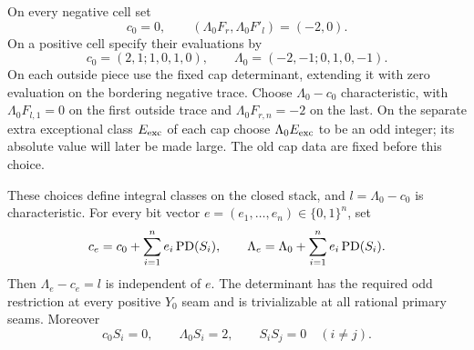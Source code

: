 On every negative cell set
\[
 c_0=0,\qquad (\Lambda_0F_r,\Lambda_0F'_l)=(-2,0).
\]
On a positive cell specify their evaluations by
\begin{equation}
 c_0=(2,1;1,0,1,0),\qquad
 \Lambda_0=(-2,-1;0,1,0,-1).
\label{eq:stack:base-lifts}
\end{equation}
On each outside piece use the fixed cap determinant, extending it with
zero evaluation on the bordering negative trace.  Choose
\(\Lambda_0-c_0\) characteristic, with
\(\Lambda_0F_{l,1}=0\) on the first outside trace and
\(\Lambda_0F_{r,n}=-2\) on the last.  On the separate extra exceptional
class \(E_{\rm exc}\) of each cap choose
\(\Lambda_0E_{\rm exc}\) to be an odd integer; its absolute value
will later be made large.  The old cap data are fixed before this choice.

\begin{lemma}
\label{lem:stack:lifts}
These choices define integral classes on the closed stack, and
\(l=\Lambda_0-c_0\) is characteristic.  For every bit vector
\(e=(e_1,\ldots,e_n)\in\{0,1\}^n\), set
\begin{equation}
 c_e=c_0+\sum_{i=1}^ne_i\operatorname{PD}(S_i),\qquad
 \Lambda_e=\Lambda_0+\sum_{i=1}^ne_i\operatorname{PD}(S_i).
\label{eq:stack:bit-lifts}
\end{equation}
Then \(\Lambda_e-c_e=l\) is independent of \(e\).  The determinant
has the required odd restriction at every positive \(Y_0\) seam and
is trivializable at all rational primary seams.  Moreover
\begin{equation}
 c_0S_i=0,\qquad \Lambda_0S_i=2,\qquad
 S_iS_j=0\quad(i\ne j).
\label{eq:stack:sphere-pairings}
\end{equation}
\end{lemma}

